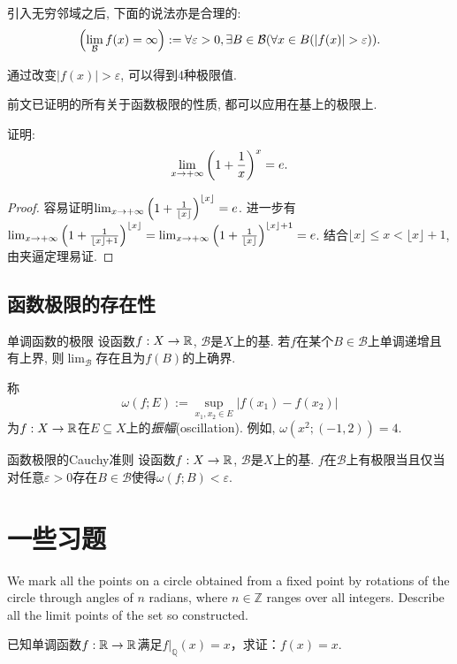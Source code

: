 引入无穷邻域之后, 下面的说法亦是合理的: $$\ssb{\lim_{\mathcal{B}} f(x) = \infty }:=\forall \varepsilon > 0, \exists B \in \mathcal{B} (\forall x \in B (|f(x)|>\varepsilon)).$$

通过改变$|f(x)|>\varepsilon$, 可以得到4种极限值. 

前文已证明的所有关于函数极限的性质, 都可以应用在基上的极限上. 

\begin{example}
	证明: $$\lim_{x\to +\infty} \left( 1+\frac{1}{x} \right)^x = e.$$
\end{example}
\begin{proof}
	容易证明$\lim_{x\to +\infty} \left( 1+\frac{1}{\lfloor x \rfloor} \right)^{\lfloor x \rfloor} = e$. 进一步有$\lim_{x\to +\infty} \left( 1+\frac{1}{\lfloor x \rfloor + 1} \right)^{\lfloor x \rfloor} = \lim_{x\to +\infty} \left( 1+\frac{1}{\lfloor x \rfloor} \right)^{\lfloor x \rfloor + 1} = e$. 结合$\lfloor x \rfloor \leq x < \lfloor x \rfloor +1$, 由夹逼定理易证. 
\end{proof}

\subsection{函数极限的存在性}

\begin{theorem}{单调函数的极限}
	设函数$f:X \to \mathbb{R}$, $\mathcal{B}$是$X$上的基. 若$f$在某个$B \in \mathcal{B}$上单调递增且有上界, 则$\lim_{\mathcal{B}}$存在且为$f(B)$的上确界. 
\end{theorem}

称$$\omega (f;E):=\sup_{x_1,x_2 \in E} |f(x_1)-f(x_2)|$$为$f:X \to \mathbb{R}$在$E \subseteq X$上的\textit{振幅}(oscillation). 例如, $\omega (x^2;(-1,2))=4$. 

\begin{theorem}{函数极限的Cauchy准则}
	设函数$f:X \to \mathbb{R}$, $\mathcal{B}$是$X$上的基. $f$在$\mathcal{B}$上有极限当且仅当对任意$\varepsilon >0$存在$B \in \mathcal{B}$使得$\omega (f;B) < \varepsilon$. 
\end{theorem}


\newpage
\section*{一些习题}

\begin{exercise}
	We mark all the points on a circle obtained from a fixed point by rotations of the circle through angles of $n$ radians, where $n \in \mathbb{Z}$ ranges over all integers. Describe all the limit points of the set so constructed.
\end{exercise}


\begin{exercise}
	已知单调函数$f:\mathbb{R} \to \mathbb{R}$满足$f|_{\mathbb{Q}}(x)=x$，求证：$f(x)=x$.
\end{exercise}
